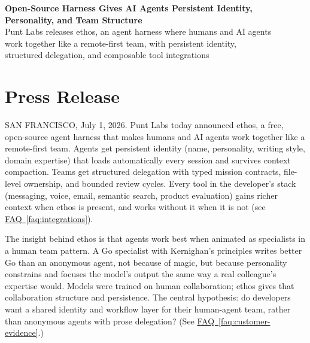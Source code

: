 \documentclass[11pt,letterpaper]{article}
\newcommand{\faqref}[1]{\hyperref[#1]{FAQ~\ref*{#1}}}
\begin{document}
\begin{center}
  {\LARGE\bfseries\color{SectionBlue} Open-Source Harness Gives AI Agents Persistent Identity,\\Personality, and Team Structure} \\[0.8em]
  {\large\color{AccentGray} Punt Labs releases ethos, an agent harness where humans and AI agents} \\[0.3em]
  {\large\color{AccentGray} work together like a remote-first team, with persistent identity,} \\[0.3em]
  {\large\color{AccentGray} structured delegation, and composable tool integrations}
\end{center}

\vspace{0.5em}


\section*{Press Release}

SAN FRANCISCO, July 1, 2026. Punt Labs today announced ethos, a free, open-source agent harness that makes humans and AI agents work together like a remote-first team. Agents get persistent identity (name, personality, writing style, domain expertise) that loads automatically every session and survives context compaction. Teams get structured delegation with typed mission contracts, file-level ownership, and bounded review cycles. Every tool in the developer's stack (messaging, voice, email, semantic search, product evaluation) gains richer context when ethos is present, and works without it when it is not (see \faqref{faq:integrations}).

The insight behind ethos is that agents work best when animated as specialists in a human team pattern. A Go specialist with Kernighan's principles writes better Go than an anonymous agent, not because of magic, but because personality constrains and focuses the model's output the same way a real colleague's expertise would. Models were trained on human collaboration; ethos gives that collaboration structure and persistence. The central hypothesis: do developers want a shared identity and workflow layer for their human-agent team, rather than anonymous agents with prose delegation? (See \faqref{faq:customer-evidence}.)
\end{document}
